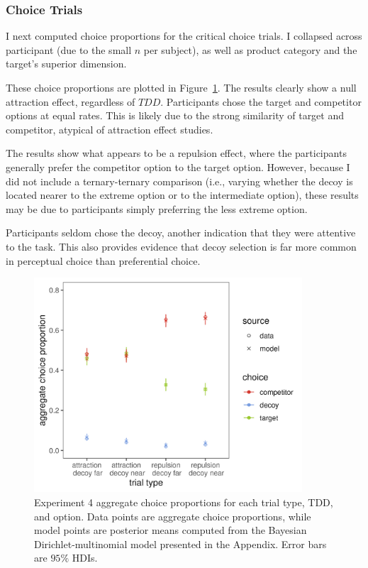 \subsubsection{Choice Trials}

I next computed choice proportions for the critical choice trials. I collapsed across participant (due to the small $n$ per subject), as well as product category and the target's superior dimension.

These choice proportions are plotted in Figure~\ref{fig:bayes_choice_model_data_plot}. The results clearly show a null attraction effect, regardless of $TDD$. Participants chose the target and competitor options at equal rates. This is likely due to the strong similarity of target and competitor, atypical of attraction effect studies. 

The results show what appears to be a repulsion effect, where the participants generally prefer the competitor option to the target option. However, because I did not include a ternary-ternary comparison (i.e., varying whether the decoy is located nearer to the extreme option or to the intermediate option), these results may be due to participants simply preferring the less extreme option.

Participants seldom chose the decoy, another indication that they were attentive to the task. This also provides evidence that decoy selection is far more common in perceptual choice than preferential choice.

\begin{figure}
    \includegraphics[scale=.5,width=100mm]{figures/bayes_choice_model_data_plot.jpeg}
    \caption{Experiment 4 aggregate choice proportions for each trial type, TDD, and option. Data points are aggregate choice proportions, while model points are posterior means computed from the Bayesian Dirichlet-multinomial model presented in the Appendix. Error bars are $95\%$ HDIs.}
    \label{fig:bayes_choice_model_data_plot}
\end{figure}

